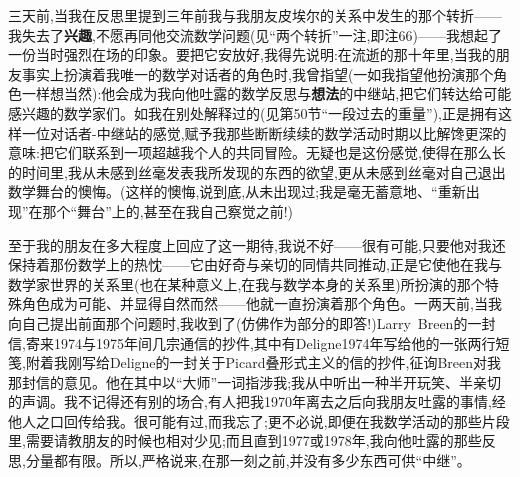 三天前,当我在反思里提到三年前我与我朋友皮埃尔的关系中发生的那个转折——我失去了\textbf{兴趣}\dmark{},不愿再同他交流数学问题(见“两个转折”一注,即注66)——我想起了一份当时强烈在场的印象。要把它安放好,我得先说明:在流逝的那十年里,当我的朋友事实上扮演着我唯一的数学对话者的角色时,我曾指望(一如我指望他扮演那个角色一样想当然):他会成为我向他吐露的数学反思与\textbf{想法}的中继站,把它们转达给可能感兴趣的数学家们。如我在别处解释过的(见第50节“一段过去的重量”),正是拥有这样一位对话者-中继站的感觉,赋予我那些断断续续的数学活动时期以比解馋更深的意味:把它们联系到一项超越我个人的共同冒险。无疑也是这份感觉,使得在那么长的时间里,我从未感到丝毫发表我所发现的东西的欲望,更从未感到丝毫对自己退出数学舞台的懊悔。(这样的懊悔,说到底,从未出现过;我是毫无蓄意地、“重新出现”在那个“舞台”上的,甚至在我自己察觉之前!)

至于我的朋友在多大程度上回应了这一期待,我说不好——很有可能,只要他对我还保持着那份数学上的热忱——它由好奇与亲切的同情共同推动,正是它使他在我与数学家世界的关系里(也在某种意义上,在我与数学本身的关系里)所扮演的那个特殊角色成为可能、并显得自然而然——他就一直扮演着那个角色。一两天前,当我向自己提出前面那个问题时,我收到了(仿佛作为部分的即答!)Larry~Breen的一封信,寄来1974与1975年间几宗通信的抄件,其中有Deligne1974年写给他的一张两行短笺,附着我刚写给Deligne的一封关于Picard叠形式主义的信的抄件,征询Breen对我那封信的意见。他在其中以“大师”一词指涉我;我从中听出一种半开玩笑、半亲切的声调。我不记得还有别的场合,有人把我1970年离去之后向我朋友吐露的事情,经他人之口回传给我。很可能有过,而我忘了;更不必说,即便在我数学活动的那些片段里,需要请教朋友的时候也相对少见;而且直到1977或1978年,我向他吐露的那些反思,分量都有限。所以,\dmark{}严格说来,在那一刻之前,并没有多少东西可供“中继”。

